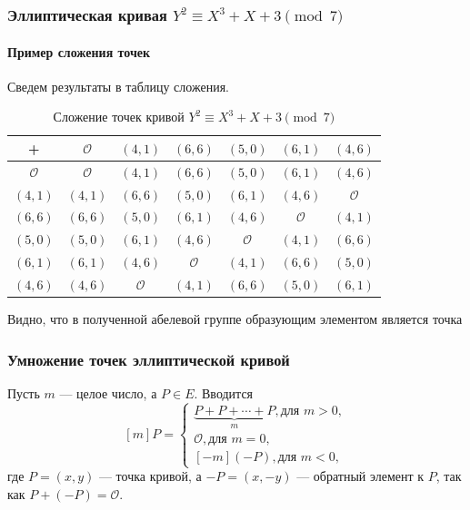 \begin{frame}
    \frametitle{Эллиптическая кривая $Y^2\equiv X^3+X+3\pmod{7}$}
    \framesubtitle{Пример сложения точек}
    
    Сведем результаты в таблицу сложения.
    \begin{table}[ht]
        \caption{Сложение точек кривой $Y^2\equiv X^3+X+3\pmod{7}$}\label{t:ellipticAddEx}
        \centering
        \begin{tabular}[c]{|c||c|c|c|c|c|c|}
            \hline
            +               &$\mathcal{O}$  &$(4,1)$        &$(6,6)$        &$(5,0)$        &$(6,1)$        &$(4,6)$\\ \hline\hline 
            $\mathcal{O}$   &$\mathcal{O}$  &$(4,1)$        &$(6,6)$        &$(5,0)$        &$(6,1)$        &$(4,6)$\\ \hline
            $(4,1)$         &$(4,1)$        &$(6,6)$        &$(5,0)$        &$(6,1)$        &$(4,6)$        &$\mathcal{O}$\\ \hline
            $(6,6)$         &$(6,6)$        &$(5,0)$        &$(6,1)$        &$(4,6)$        &$\mathcal{O}$  &$(4,1)$\\ \hline
            $(5,0)$         &$(5,0)$        &$(6,1)$        &$(4,6)$        &$\mathcal{O}$  &$(4,1)$        &$(6,6)$\\ \hline
            $(6,1)$         &$(6,1)$        &$(4,6)$        &$\mathcal{O}$  &$(4,1)$        &$(6,6)$        &$(5,0)$\\ \hline
            $(4,6)$         &$(4,6)$        &$\mathcal{O}$  &$(4,1)$        &$(6,6)$        &$(5,0)$        &$(6,1)$\\ \hline
        \end{tabular}
    \end{table}
    Видно, что в полученной абелевой группе \alert{образующим} элементом является точка 
\end{frame}


\begin{frame}
    \frametitle{Умножение точек эллиптической кривой}

    Пусть $m$ --- целое число, а $P\in E$. Вводится
    \[
        [m]P = 
        \begin{cases}
            \displaystyle
            \underbrace{P+P+\cdots+P}_m, \text{для $m>0$},\\
            \mathcal{O}, \text{для $m=0$},\\
            [-m](-P), \text{для $m<0$},
        \end{cases}
    \] где $P=(x,y)$ --- точка кривой, а $-P=(x,-y)$ --- обратный элемент к $P$, так как $P+(-P)=\mathcal{O}$.
\end{frame}


